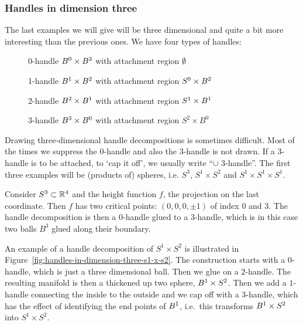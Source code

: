 \subsubsection*{Handles in dimension three}
The last examples we will give will be three dimensional and quite a bit more interesting than the previous ones.
We have four types of handles:


\begin{description}
    \item[]  0-handle  $ B^{0} \times B^{3}$ with attachment region $\emptyset$ 
    \item[] 1-handle  $ B^{1} \times B^{2}$ with attachment region $ S^{0} \times B^{2}$
    \item[] 2-handle  $ B^{2} \times B^{1}$ with attachment region $ S^{1} \times B^{1}$
    \item[] 3-handle  $ B^{3} \times B^{0}$ with attachment region $S^{2} \times B^{0}$
\end{description}

Drawing three-dimensional handle decompositions is sometimes difficult. Most of the times we suppress the $0$-handle and also the $3$-handle is not drawn. If a $3$-handle is to be attached, to `cap it off', we usually write ``$\cup $ $3$-handle''.
The first three examples will be (products of) spheres, i.e. $S^{3}$, $S^{1} \times S^{2}$ and $S^{1} \times S^{1} \times S^{1}$.
\begin{eg}
    Consider $S^{3} \subset \mathbb{R}^{4}$ and the height function $f$, the projection on the last coordinate.
    Then $f$ has two critical points: $(0, 0, 0, \pm 1)$ of index $0$ and $3$.
    The handle decomposition is then a $0$-handle glued to a $3$-handle, which is in this case two balls $B^{3}$ glued along their boundary.
\end{eg}

\begin{eg}
    An example of a handle decomposition of $S^{1} \times S^{2}$ is illustrated in Figure~\ref{fig:handles-in-dimension-three-s1-x-s2}.
    The construction starts with a $0$-handle, which is just a three dimensional ball.
    Then we glue on a $2$-handle.
    The resulting manifold is then a thickened up two sphere, $B^{1} \times S^{2}$.
    Then we add a $1$-handle connecting the inside to the outside and we cap off with a $3$-handle, which has the effect of identifying the end points of $B^{1}$, i.e.\ this transforms  $B^{1} \times S^{2}$ into $ S^1 \times S^{2}$.
\end{eg}

